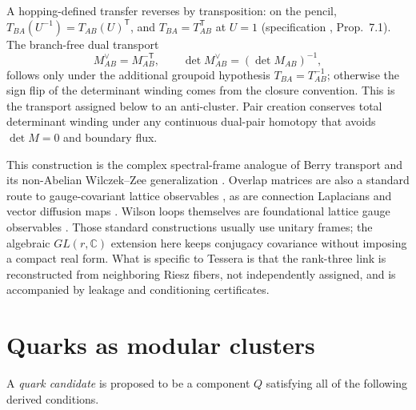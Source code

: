\documentclass[11pt,letterpaper]{article}
\begin{document}
A hopping-defined transfer reverses by transposition: on the pencil,
$T_{BA}(U^{-1})=T_{AB}(U)^{\mathsf T}$, and $T_{BA}=T_{AB}^{\mathsf T}$ at
$U=1$ (specification \cite{whitneyspec}, Prop.~7.1). The branch-free dual
transport
\begin{equation*}
  M_{AB}^{\vee}=M_{AB}^{-\mathsf T},\qquad
  \det M_{AB}^{\vee}=(\det M_{AB})^{-1},
\end{equation*}
follows only under the additional groupoid hypothesis $T_{BA}=T_{AB}^{-1}$;
otherwise the sign flip of the determinant winding comes from the closure
convention. This is the transport assigned below to an anti-cluster. Pair creation
conserves total determinant winding under any continuous dual-pair homotopy
that avoids $\det M=0$ and boundary flux.

This construction is the complex spectral-frame analogue of Berry transport
\cite{berry1984} and its non-Abelian Wilczek--Zee generalization
\cite{wilczekzee1984}. Overlap matrices are also a standard route to
gauge-covariant lattice observables \cite{fukui2005}, as are connection
Laplacians and vector diffusion maps \cite{singerwu2012}. Wilson loops
themselves are foundational lattice gauge observables \cite{wilson1974}.
Those standard constructions usually use unitary frames; the algebraic
$GL(r,\mathbb C)$ extension here keeps conjugacy covariance without imposing a
compact real form. What is specific to Tessera is that the rank-three link is
reconstructed from neighboring Riesz fibers, not independently assigned, and
is accompanied by leakage and conditioning certificates.

\section{Quarks as modular clusters}\label{sec:quarks}

A \emph{quark candidate} is proposed to be a component $Q$ satisfying all
of the following derived conditions.
\end{document}
